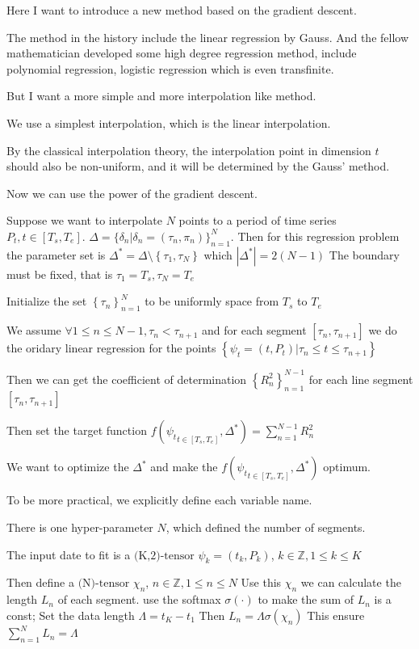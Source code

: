 \documentclass{article}
\theoremstyle{definition} %
\begin{document}
Here I want to introduce a new method based
on the gradient descent.

The method in the history include the
linear regression by Gauss. And the fellow
mathematician developed some high degree
regression method, include polynomial regression,
logistic regression which is even transfinite.

But I want a more simple and more interpolation
like method.

We use a simplest interpolation, which is
the linear interpolation.

By the classical interpolation theory,
the interpolation point in dimension
$t$ should also be non-uniform, and it
will be determined by the Gauss' method.

Now we can use the power of the gradient
descent.

Suppose we want to interpolate $N$ points
to a period of time series
$P_t,t\in\left[T_s,T_e\right]$.
$\Delta=\{\delta_n|\delta_n=
    (\tau_n,\pi_n)\}_{n=1}^N$.
Then for this regression problem the
parameter set is
$\Delta^*=\Delta\setminus\left\{\tau_1,\tau_N\right\}$ which
$
    \left|
    \Delta^*
    \right|=2\left(N-1\right)
$
The boundary must be fixed, that is
$\tau_1=T_s,\tau_N=T_e$

Initialize the set
$\left\{\tau_n\right\}_{n=1}^N$
to be uniformly space from $T_s$ to $T_e$

We assume
$\forall 1\leq n\leq N-1,\tau_n<\tau_{n+1}$
and for each segment
$\left[\tau_n,\tau_{n+1}\right]$
we do the oridary linear regression
for the points
$\left\{\psi_t=\left(t,P_t\right)|
    \tau_n\leq t\leq\tau_{n+1}\right\}$

Then we can get the coefficient of determination
$\left\{R^2_n\right\}_{n=1}^{N-1}$
for each line segment
$\left[\tau_n,\tau_{n+1}\right]$

Then set the target function
$f({\psi_t}_{t\in\left[T_s,T_e\right]},
    \Delta^*)
    =\sum_{n=1}^{N-1}R^2_n$

We want to optimize the $\Delta^*$
and make the
$f({\psi_t}_{t\in\left[T_s,T_e\right]},
    \Delta^*)$
optimum.

To be more practical, we explicitly define
each variable name.

There is one hyper-parameter $N$, which
defined the number of segments.

The input date to fit is a
$\text{(K,2)-tensor}$
$\psi_k=\left(t_k,P_k\right)$,
$k\in\mathbb{Z},1\leq k\leq K$

Then define a $\text{(N)-tensor}$ $\chi_n$,
$n\in\mathbb{Z},1\leq n\leq N$
Use this $\chi_n$ we can calculate
the length $L_n$ of each segment.
use the softmax $\sigma(\cdot)$
to make the sum of $L_n$
is a const;
Set the data length $\Lambda=t_K-t_1$
Then $L_n=\Lambda\sigma(\chi_n)$
This ensure
$\sum_{n=1}^{N}L_n=\Lambda$
\end{document}
